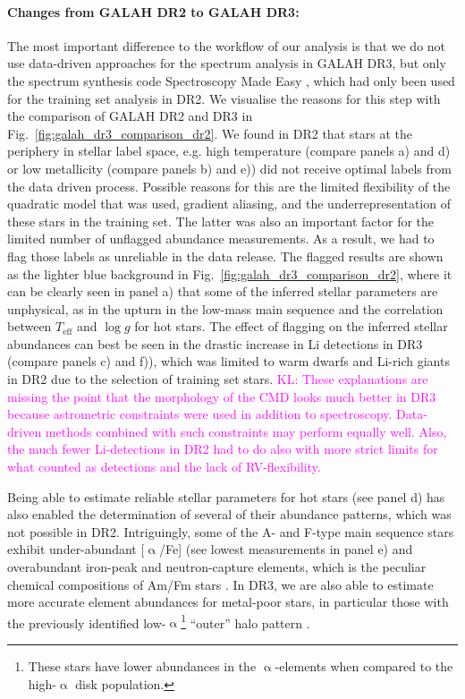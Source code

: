 \documentclass[fleqn,usenatbib,useAMS]{mnras}
\newcommand{\Teff}{$T_\mathrm{eff}$\xspace}
\newcommand{\logg}{$\log g$\xspace}
\newcommand\KL[1]{\textcolor{magenta}{KL: #1}}
\begin{document}
\paragraph*{Changes from GALAH DR2 to GALAH DR3:} The most important difference to the workflow of our analysis is that we do not use data-driven approaches for the spectrum analysis in GALAH DR3, but only the spectrum synthesis code Spectroscopy Made Easy \citep[][hereafter {\textsc{sme}}]{Valenti1996, Piskunov2017}, which had only been used for the training set analysis in DR2. We visualise the reasons for this step with the comparison of GALAH DR2 and DR3 in Fig.~\ref{fig:galah_dr3_comparison_dr2}. We found in DR2 that stars at the periphery in stellar label space, e.g. high temperature (compare panels a) and d) or low metallicity (compare panels b) and e)) did not receive optimal labels from the data driven process.  
Possible reasons for this are the limited flexibility of the quadratic model that was used, gradient aliasing, and the underrepresentation of these stars in the training set. The latter was also an important factor for the limited number of unflagged abundance measurements. As a result, we had to flag those labels as unreliable in the data release. The flagged results are shown as the lighter blue background in Fig.~\ref{fig:galah_dr3_comparison_dr2}, where it can be clearly seen in panel a) that some of the inferred stellar parameters are unphysical, as in the upturn in the low-mass main sequence and the correlation between \Teff and \logg for hot stars. The effect of flagging on the inferred stellar abundances can best be seen in the drastic increase in Li detections in DR3 (compare panels c) and f)), which was limited to warm dwarfs and Li-rich giants in DR2 due to the selection of training set stars. \KL{These explanations are missing the point that the morphology of the CMD looks much better in DR3 because astrometric constraints were used in addition to spectroscopy. Data-driven methods combined with such constraints may perform equally well. Also, the much fewer Li-detections in DR2 had to do also with more strict limits for what counted as detections and the lack of RV-flexibility.}

Being able to estimate reliable stellar parameters for hot stars (see panel d) has also enabled the determination of several of their abundance patterns, which was not possible in DR2. Intriguingly, some of the A- and F-type main sequence stars exhibit under-abundant [$\upalpha$/Fe] (see lowest measurements in panel e) and overabundant iron-peak and neutron-capture elements, which is the peculiar chemical compositions of Am/Fm stars \citep[see e.g.][]{Xiang2020}. In DR3, we are also able to estimate more accurate element abundances for metal-poor stars, in particular those with the previously identified low-$\upalpha$\footnote{These stars have lower abundances in the $\upalpha$-elements when compared to the high-$\upalpha$ disk population.} ``outer'' halo pattern \citep[see e.g.][]{Nissen2010}.
\end{document}
